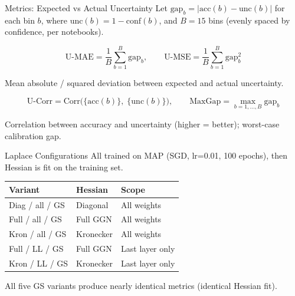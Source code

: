 \documentclass{beamer}
\begin{document}
\begin{frame}{Metrics: Expected vs Actual Uncertainty}
Let $\text{gap}_b = |\text{acc}(b) - \text{unc}(b)|$ for each bin $b$, where $\text{unc}(b) = 1 - \text{conf}(b)$, and $B = 15$ bins (evenly spaced by confidence, per notebooks).

\vspace{-0.2cm}
\[
\text{U-MAE} = \frac{1}{B}\sum_{b=1}^{B} \text{gap}_b, \qquad
\text{U-MSE} = \frac{1}{B}\sum_{b=1}^{B} \text{gap}_b^2
\]

Mean absolute / squared deviation between expected and actual uncertainty.

\vspace{0.1cm}
\[
\text{U-Corr} = \text{Corr}\bigl(\{\text{acc}(b)\},\;\{\text{unc}(b)\}\bigr), \qquad
\text{MaxGap} = \max_{b=1,\dots,B} \text{gap}_b
\]

Correlation between accuracy and uncertainty (higher = better); worst-case calibration gap.
\end{frame}

\begin{frame}{Laplace Configurations}
All trained on MAP (SGD, lr=0.01, 100 epochs), then Hessian is fit on the training set.
\begin{table}
\centering
\small
\begin{tabular}{lll}
\toprule
\textbf{Variant} & \textbf{Hessian} & \textbf{Scope} \\
\midrule
Diag / all / GS & Diagonal & All weights \\
Full / all / GS & Full GGN & All weights \\
Kron / all / GS & Kronecker & All weights \\
Full / LL / GS & Full GGN & Last layer only \\
Kron / LL / GS & Kronecker & Last layer only \\
\bottomrule
\end{tabular}
\end{table}
All five GS variants produce nearly identical metrics (identical Hessian fit).
\end{frame}
\end{document}
